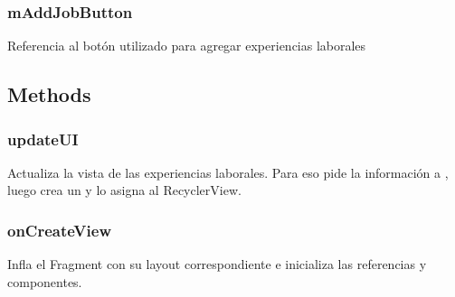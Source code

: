 \documentclass[letterpaper,10pt,english]{sphinxmanual}
\begin{document}
\subsubsection{mAddJobButton}
\label{Fragments/JobsFragment:maddjobbutton}

\begin{fulllineitems}
\label{Fragments/JobsFragment:com.fiuba.tallerii.jobify.JobsFragment.mAddJobButton}
Referencia al botón utilizado para agregar experiencias laborales

\end{fulllineitems}



\subsection{Methods}
\label{Fragments/JobsFragment:methods}

\subsubsection{updateUI}
\label{Fragments/JobsFragment:updateui}

\begin{fulllineitems}
\label{Fragments/JobsFragment:com.fiuba.tallerii.jobify.JobsFragment.updateUI()}
Actualiza la vista de las experiencias laborales. Para eso pide la información a , luego crea un  y lo asigna al RecyclerView.

\end{fulllineitems}



\subsubsection{onCreateView}
\label{Fragments/JobsFragment:oncreateview}

\begin{fulllineitems}
\label{Fragments/JobsFragment:com.fiuba.tallerii.jobify.JobsFragment.onCreateView(LayoutInflater, ViewGroup, Bundle)}
Infla el Fragment con su layout correspondiente e inicializa las referencias y componentes.

\end{fulllineitems}
\end{document}
